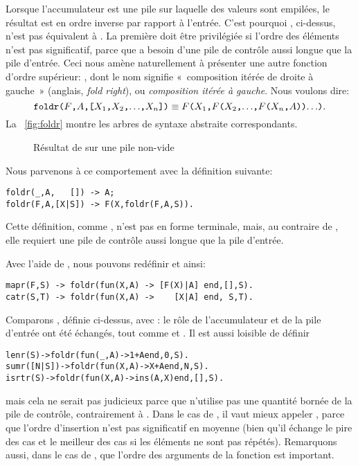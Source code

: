 Lorsque l'accumulateur est une pile sur laquelle des valeurs sont
empilées, le résultat est en ordre inverse par rapport à
l'entrée. C'est pourquoi , ci-dessus, n'est pas
équivalent à . La première doit être privilégiée si
l'ordre des éléments n'est pas significatif, parce que 
a besoin d'une pile de contrôle aussi longue que la pile
d'entrée. Ceci nous amène naturellement à présenter une autre fonction
d'ordre supérieur: , dont le nom signifie
«~composition itérée de droite à gauche~» (anglais, \emph{fold right}),
ou \emph{composition itérée à gauche}. Nous voulons dire:
\begin{equation*}
\texttt{foldr(\(F\),\(A\),[\(X_1\),\(X_2\),\(\ldots\),\(X_{n}\)])}
\equiv
\texttt{\(F\)(\(X_1\),\(F\)(\(X_2\),\(\ldots\),\(F\)(\(X_{n}\),\(A\)))\(\ldots\))}.
\end{equation*}
La \fig~\vref{fig:foldr} montre les arbres de syntaxe abstraite
correspondants.
\begin{figure}
\centering
{}
\qquad
{}
\caption{Résultat de  sur une pile non-vide
\label{fig:foldr}}
\end{figure}
Nous parvenons à ce comportement avec la définition suivante:
\begin{verbatim}
foldr(_,A,   []) -> A;
foldr(F,A,[X|S]) -> F(X,foldr(F,A,S)).
\end{verbatim}
Cette définition, comme , n'est pas en forme
terminale, mais, au contraire de , elle requiert une
pile de contrôle aussi longue que la pile d'entrée.

Avec l'aide de , nous pouvons redéfinir
 et  ainsi:
\begin{verbatim}
mapr(F,S) -> foldr(fun(X,A) -> [F(X)|A] end,[],S).
catr(S,T) -> foldr(fun(X,A) ->    [X|A] end, S,T).
\end{verbatim}
Comparons , définie ci-dessus, avec :
le rôle de l'accumulateur et de la pile d'entrée ont été échangés,
tout comme  et . Il est aussi
loisible de définir
\begin{alltt}
lenr(S)     -> foldr(fun(_,A) -> 1+A end, 0,S).\hfill% \emph{Mauvais}
sumr([N|S]) -> foldr(fun(X,A) -> X+A end, N,S).\hfill% \emph{Mauvais}
isrtr(S)    -> foldr(fun(X,A) -> ins(A,X) end,[],S).\hfill% \emph{Non}
\end{alltt}
mais cela ne serait pas judicieux parce que 
n'utilise pas une quantité bornée de la pile de contrôle,
contrairement à . Dans le cas de , il
vaut mieux appeler , parce que l'ordre d'insertion
n'est pas significatif en moyenne (bien qu'il échange le pire des cas
et le meilleur des cas si les éléments ne sont pas
répétés). Remarquons aussi, dans le cas de , que
l'ordre des arguments de la fonction  est important.

